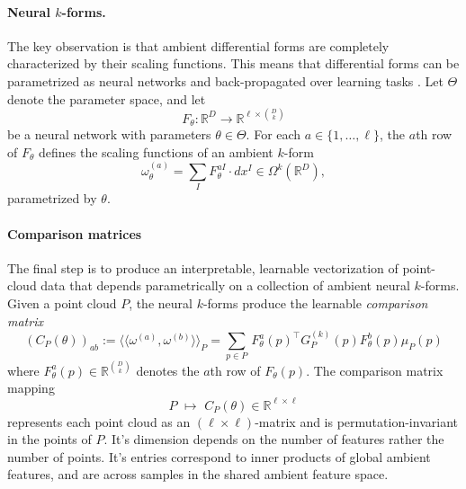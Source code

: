 \documentclass{article}
\newcommand{\R}{\mathbb{R}}
\newcommand{\llangle}{\langle \! \langle}
\newcommand{\rrangle}{\rangle \! \rangle}
\theoremstyle{remark}
\theoremstyle{plain}
\begin{document}
\paragraph{Neural $k$-forms.} The key observation is that ambient differential forms are completely characterized by their scaling functions. This means that differential forms can be parametrized as neural networks and back-propagated over learning tasks \cite{maggs2023simplicial}. Let $\Theta$ denote the parameter space, and let
\begin{equation}
F_{\theta}:\mathbb{R}^D
\to
\mathbb{R}^{\ell \times \binom{D}{k}}
\end{equation}
be a neural network with parameters $\theta \in \Theta$. For each $a\in\{1,\ldots,\ell\}$, the $a$th row of
$F_\theta$ defines the scaling functions of an ambient $k$-form
\begin{equation}
\omega_{\theta}^{(a)}
=
\sum_I
F_{\theta}^{aI} \cdot dx^I
\in \Omega^k(\mathbb{R}^D),
\end{equation}
parametrized by $\theta$. 

\paragraph{Comparison matrices} The final step is to produce an interpretable, learnable vectorization of point-cloud data that depends parametrically on a collection of ambient neural $k$-forms. Given a point cloud $P$, the neural $k$-forms produce the learnable \textit{comparison matrix}
\begin{equation}
\left(C_P(\theta)\right)_{ab} := \llangle \omega^{(a)}, \omega^{(b)} \rrangle_P = 
\sum_{p\in P}
\,
F_{\theta}^{a}(p)^\top
G_P^{(k)}(p)
F_{\theta}^{b}(p) \mu_P(p)
\end{equation}
where $F_{\theta}^{a}(p)\in\mathbb{R}^{\binom{D}{k}}$ denotes the $a$th row of
$F_\theta(p)$. The comparison matrix mapping \begin{equation}
P \, \, 
 \mapsto \, \, 
C_P(\theta)
\in \R^{\ell \times \ell}
\end{equation} represents each point cloud as an $(\ell \times \ell)$-matrix and is permutation-invariant in the points of $P$. It's dimension depends on the number of features rather the number of points. It's entries correspond to inner products of global ambient features, and are across samples in the shared ambient feature space.
\end{document}
